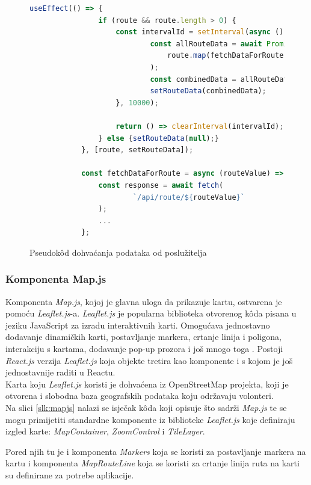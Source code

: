 \documentclass[zavrsnirad]{fer}
\begin{document}
\begin{figure}[H]
	\centering
	\begin{minipage}{0.9\linewidth}
		\begin{lstlisting}[language=JavaScript]			
			useEffect(() => {
				if (route && route.length > 0) {
					const intervalId = setInterval(async () => {
							const allRouteData = await Promise.all(
								route.map(fetchDataForRoute)
							);
							const combinedData = allRouteData.flat();
							setRouteData(combinedData);
					}, 10000);
					
					return () => clearInterval(intervalId);
				} else {setRouteData(null);}
			}, [route, setRouteData]);
			
			const fetchDataForRoute = async (routeValue) => {
				const response = await fetch(
						`/api/route/${routeValue}`
				);
				...
			};
		\end{lstlisting}
	\end{minipage}
	\caption{Pseudok\^od dohvaćanja podataka od poslužitelja}
	\label{slk:dohvatpodataka}
\end{figure}

\subsubsection{Komponenta Map.js}
Komponenta \textit{Map.js}, kojoj je glavna uloga da prikazuje kartu, ostvarena je pomoću \textit{\textit{Leaflet.js}}-a.
\textit{\textit{Leaflet.js}} je popularna biblioteka otvorenog kôda pisana u jeziku JavaScript za izradu interaktivnih karti. Omogućava jednostavno dodavanje dinamičkih karti, postavljanje markera, crtanje linija i poligona, interakciju s kartama, dodavanje pop-up prozora i još mnogo toga \cite{leaflet}.
Postoji \textit{React.js} verzija \textit{\textit{Leaflet.js}} koja objekte tretira kao komponente i s kojom je još jednostavnije raditi u Reactu.\\
Karta koju \textit{\textit{Leaflet.js}} koristi je dohvaćena iz OpenStreetMap projekta, koji je otvorena i slobodna baza geografskih podataka koju održavaju volonteri.\\

Na slici \ref{slk:mapjs} nalazi se isječak k\^oda koji opisuje što sadrži \textit{Map.js} te se mogu primijetiti standardne komponente iz biblioteke \textit{Leaflet.js} koje definiraju izgled karte: \textit{MapContainer}, \textit{ZoomControl} i \textit{TileLayer}.

Pored njih tu je i komponenta \textit{Markers} koja se koristi za postavljanje markera na kartu i komponenta \textit{MapRouteLine} koja se koristi za crtanje linija ruta na karti su definirane za potrebe aplikacije.
\end{document}
